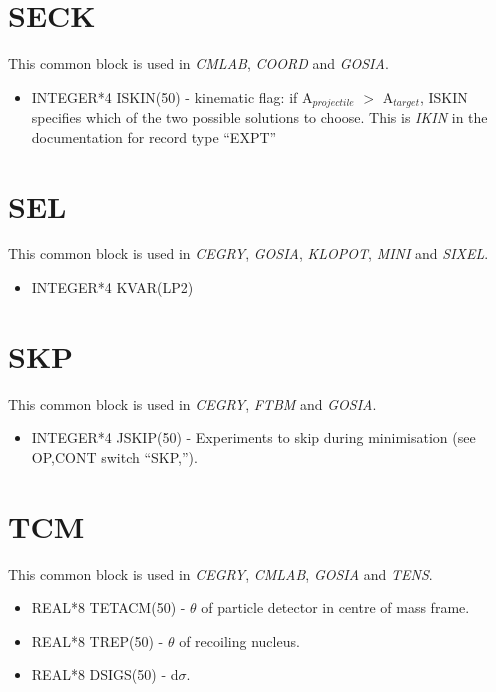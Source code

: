 \section{SECK}

This common block is used in \emph{CMLAB}, \emph{COORD} and \emph{GOSIA}.

\begin{itemize}
\item INTEGER*4 ISKIN(50) - kinematic flag: if A$_{projectile}$ $>$
A$_{target}$, ISKIN specifies which of the two possible solutions to choose.
This is \emph{IKIN} in the documentation for record type ``EXPT''
\end{itemize}

\section{SEL}

This common block is used in \emph{CEGRY}, \emph{GOSIA}, \emph{KLOPOT}, \emph{
MINI} and \emph{SIXEL}.

\begin{itemize}
\item INTEGER*4 KVAR(LP2)
\end{itemize}

\section{SKP}

This common block is used in \emph{CEGRY}, \emph{FTBM} and \emph{GOSIA}.

\begin{itemize}
\item INTEGER*4 JSKIP(50) - Experiments to skip during minimisation (see
OP,CONT switch ``SKP,'').
\end{itemize}

\section{TCM}

This common block is used in \emph{CEGRY}, \emph{CMLAB}, \emph{GOSIA} and \emph{
TENS}.

\begin{itemize}
\item REAL*8 TETACM(50) - $\theta$ of particle detector in centre of mass
frame.
\item REAL*8 TREP(50) - $\theta$ of recoiling nucleus.
\item REAL*8 DSIGS(50) - d$\sigma$.
\end{itemize}

